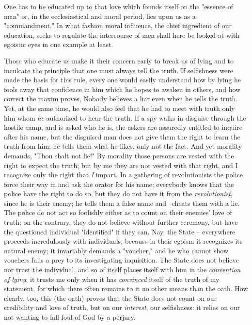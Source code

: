 \documentclass[a4paper]{book}
\begin{document}
One has to be educated up to that love which founds itself on the "{}essence 
of man"{} or, in the ecclesiastical and moral period, lies upon us as a 
"{}commandment."{} In what fashion moral influence, the chief ingredient of 
our education, seeks to regulate the intercourse of men shall here be looked 
at with egoistic eyes in one example at least.

Those who educate us make it their concern early to break us of lying and to 
inculcate the principle that one must always tell the truth. If selfishness 
were made the basis for this rule, every one would easily understand how by 
lying he fools away that confidence in him which he hopes to awaken in others, 
and how correct the maxim proves, Nobody believes a liar even when he tells 
the truth. Yet, at the same time, he would also feel that he had to meet with 
truth only him whom \textit{he} authorized to hear the truth. If a spy walks 
in disguise through the hostile camp, and is asked who he is, the askers are 
assuredly entitled to inquire after his name, but the disguised man does not 
give them the right to learn the truth from him; he tells them what he likes, 
only not the fact. And yet morality demands, "{}Thou shalt not lie!"{} By 
morality those persons are vested with the right to expect the truth; but by 
me they are not vested with that right, and I recognize only the right that 
\textit{I} impart. In a gathering of revolutionists the police force their way 
in and ask the orator for his name; everybody knows that the police have the 
right to do so, but they do not have it from the \textit{revolutionist}, since 
he is their enemy; he tells them a false name and --cheats them with a lie. 
The police do not act so foolishly either as to count on their enemies' love 
of truth; on the contrary, they do not believe without further ceremony, but 
have the questioned individual "{}identified"{} if they can. Nay, the State -- 
everywhere proceeds incredulously with individuals, because in their egoism it 
recognizes its natural enemy; it invariably demands a "{}voucher,"{} and he 
who cannot show vouchers falls a prey to its investigating inquisition. The 
State does not believe nor trust the individual, and so of itself places 
itself with him in the \textit{convention of lying}; it trusts me only when it 
has \textit{convinced} itself of the truth of my statement, for which there 
often remains to it no other means than the oath. How clearly, too, this (the 
oath) proves that the State does not count on our credibility and love of 
truth, but on our \textit{interest}, our selfishness: it relies on our not 
wanting to fall foul of God by a perjury.
\end{document}
